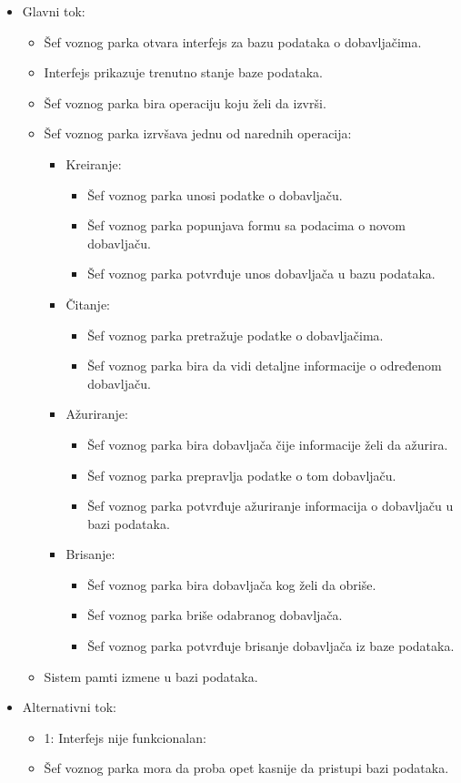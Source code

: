\begin{itemize}
	\item Glavni tok:
		\begin{itemize}
		    \item Šef voznog parka otvara interfejs za bazu podataka o dobavljačima.
		    \item Interfejs prikazuje trenutno stanje baze podataka.
		    \item Šef voznog parka bira operaciju koju želi da izvrši.
			\item Šef voznog parka izrvšava jednu od narednih operacija:
			\begin{itemize}
    \item Kreiranje:
    \begin{itemize}
        \item Šef voznog parka unosi podatke o dobavljaču.
        \item Šef voznog parka popunjava formu sa podacima o novom dobavljaču.
        \item Šef voznog parka potvrđuje unos dobavljača u bazu podataka.
    \end{itemize}
    \item Čitanje:
    \begin{itemize}
        \item Šef voznog parka pretražuje podatke o dobavljačima.
        \item Šef voznog parka bira da vidi detaljne informacije o određenom dobavljaču.
    \end{itemize}
    \item Ažuriranje:
    \begin{itemize}
        \item Šef voznog parka bira dobavljača čije informacije želi da ažurira.
        \item Šef voznog parka prepravlja podatke o tom dobavljaču.
        \item Šef voznog parka potvrđuje ažuriranje informacija o dobavljaču u bazi podataka.
    \end{itemize}
    \item Brisanje:
    \begin{itemize}
        \item Šef voznog parka bira dobavljača kog želi da obriše.
        \item Šef voznog parka briše odabranog dobavljača.
        \item Šef voznog parka potvrđuje brisanje dobavljača iz baze podataka.
    \end{itemize}
\end{itemize}
		\item Sistem pamti izmene u bazi podataka.
		\end{itemize}

	\item Alternativni tok:
		\begin{itemize}
		    \item 1: Interfejs nije funkcionalan:
			\item Šef voznog parka mora da proba opet kasnije da pristupi bazi podataka.
		\end{itemize}

\end{itemize}



